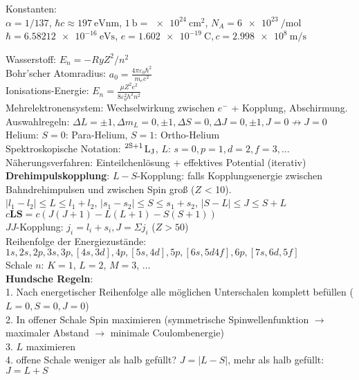 \documentclass[9pt, landscape,a4paper]{extarticle}
\renewcommand\v[1]{\vec{#1}}
\renewcommand{\vec}[1]{\mathbf{#1}}
\newcommand*\abs[1]{\lvert#1\rvert}
\begin{document}
\small
\begin{multicols*}{3}
\raggedcolumns
Konstanten: \\
$α = 1/137$, $\hbar c \approx \SI{197}{\electronvolt\nano\meter}$, $\SI{1}{\barn} = \SI{e24}{\centi\meter\squared}$, $N_A = \SI{6e23}{\per\mol}$ \\
$\hbar = \SI{6.58212e-16}{\electronvolt\second}$, $e = \SI{1.602e-19}{\coulomb}, c = \SI{2.998e8}{\meter\per\second}$

Wasserstoff: $E_n = -Ry Z^2 / n^2$ \\
Bohr'scher Atomradius: $a_0 = \frac{4π ε_0 \hbar^2}{m_e e^2}$ \\
Ionisations-Energie: $E_n = \frac{μ Z^2 e^2}{8ε_0^2 h^2 n^2}$ \\
Mehrelektronensystem: Wechselwirkung zwischen $e^{-}$ + Kopplung, Abschirmung. \\
Auswahlregeln: $ΔL = \pm 1, Δ m_L = 0, \pm 1, ΔS = 0, ΔJ = 0, \pm 1, J = 0 \not \to J = 0$ \\
Helium: $S = 0$: Para-Helium, $S = 1$: Ortho-Helium \\
Spektroskopische Notation: $\ce{^{2S+1} L_J}$, $L$: $s = 0, p = 1, d = 2, f = 3, \dots$ \\
Näherungsverfahren: Einteilchenlösung + effektives Potential (iterativ) \\
\textbf{Drehimpulskopplung}:
$L-S$-Kopplung: falls Kopplungsenergie zwischen Bahndrehimpulsen und zwischen Spin groß ($Z$ < 10). \\
$\abs{l_1 - l_2} \leq L \leq l_1 + l_2$, $\abs{s_1 - s_2} \leq S \leq s_1 + s_2$, $\abs{S - L} \leq J \leq S + L$ \\
$c \v L \v S = c(J(J + 1) - L(L + 1) - S(S + 1))$ \\
$JJ$-Kopplung: $j_i = l_i + s_i, J = Σ j_i$ ($Z > 50$) \\
Reihenfolge der Energiezustände: \\
$1s, 2s, 2p, 3s, 3p, [4s, 3d], 4p, [5s, 4d], 5p, [6s, 5d 4f], 6p, [7s, 6d, 5f]$ \\
Schale $n$: $K = 1$, $L = 2$, $M = 3$, $\dots$ \\
\textbf{Hundsche Regeln}: \\
1. Nach	energetischer Reihenfolge alle möglichen Unterschalen komplett befüllen ($L = 0, S = 0, J = 0$) \\
2. In offener Schale Spin maximieren (symmetrische Spinwellenfunktion $\to$ maximaler Abstand $\to$ minimale Coulombenergie) \\
3. $L$ maximieren \\
4. offene Schale weniger als halb gefüllt? $J = \abs{L - S}$, mehr als halb gefüllt: $J = L + S$ \\


\end{multicols*}
\end{document}

